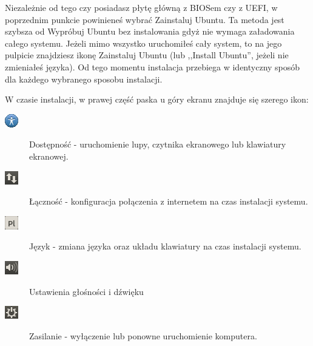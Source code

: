 Niezależnie od tego czy posiadasz płytę główną z BIOSem czy z UEFI, w poprzednim punkcie powinieneś wybrać \textcolor{ubuntu_orange}{Zainstaluj Ubuntu}. Ta metoda jest szybsza od \textcolor{ubuntu_orange}{Wypróbuj Ubuntu bez instalowania} gdyż nie wymaga załadowania całego systemu. Jeżeli mimo wszystko uruchomiłeś cały system, to na jego pulpicie znajdziesz ikonę \textcolor{ubuntu_orange}{Zainstaluj Ubuntu} (lub ,,Install Ubuntu'', jeżeli nie zmieniałeś języka). Od tego momentu instalacja przebiega w identyczny sposób dla każdego wybranego sposobu instalacji.

W czasie instalacji, w prawej część paska u góry ekranu znajduje się szerego ikon:
\begin{description}
\item[\includegraphics{images/ikony_dostempnosc.png}]\textcolor{ubuntu_orange}{Dostępność} - uruchomienie lupy, czytnika ekranowego lub klawiatury ekranowej.
\item[\includegraphics{images/ikony_internet.png}]\textcolor{ubuntu_orange}{Łączność} - konfiguracja połączenia z internetem na czas instalacji systemu.
\item[\includegraphics{images/ikony_jezyk.png}]\textcolor{ubuntu_orange}{Język} - zmiana języka oraz układu klawiatury na czas instalacji systemu.
\item[\includegraphics{images/ikony_dzwiek.png}]\textcolor{ubuntu_orange}{Ustawienia głośności i dźwięku}
\item[\includegraphics{images/ikony_zasilanie.png}]\textcolor{ubuntu_orange}{Zasilanie} - wyłączenie lub ponowne uruchomienie komputera.
\end{description}
\clearpage
